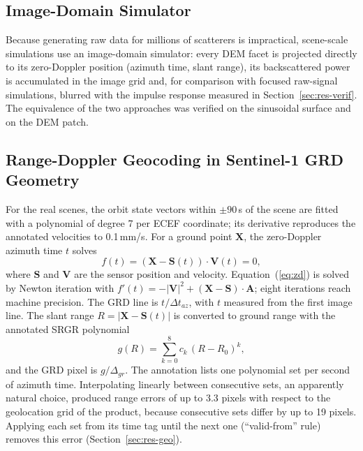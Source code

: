 \documentclass[10pt,a4paper]{article}
\begin{document}
\subsection{Image-Domain Simulator}
Because generating raw data for millions of scatterers is impractical, scene-scale simulations use an image-domain simulator: every DEM facet is projected directly to its zero-Doppler position (azimuth time, slant range), its backscattered power is accumulated in the image grid and, for comparison with focused raw-signal simulations, blurred with the impulse response measured in Section~\ref{sec:res-verif}. The equivalence of the two approaches was verified on the sinusoidal surface and on the DEM patch.

\subsection{Range-Doppler Geocoding in Sentinel-1 GRD Geometry}
For the real scenes, the orbit state vectors within $\pm90$\,s of the scene are fitted with a polynomial of degree 7 per ECEF coordinate; its derivative reproduces the annotated velocities to 0.1\,mm/s. For a ground point $\mathbf{X}$, the zero-Doppler azimuth time $t$ solves
\begin{equation}
f(t)=\left(\mathbf{X}-\mathbf{S}(t)\right)\cdot\mathbf{V}(t)=0,
\label{eq:zd}
\end{equation}
where $\mathbf{S}$ and $\mathbf{V}$ are the sensor position and velocity. Equation~(\ref{eq:zd}) is solved by Newton iteration with $f'(t)=-|\mathbf{V}|^2+(\mathbf{X}-\mathbf{S})\cdot\mathbf{A}$; eight iterations reach machine precision. The GRD line is $t/\Delta t_{az}$, with $t$ measured from the first image line. The slant range $R=|\mathbf{X}-\mathbf{S}(t)|$ is converted to ground range with the annotated SRGR polynomial
\begin{equation}
g(R)=\sum_{k=0}^{8}c_k\,(R-R_0)^k ,
\end{equation}
and the GRD pixel is $g/\Delta_{gr}$. The annotation lists one polynomial set per second of azimuth time. Interpolating linearly between consecutive sets, an apparently natural choice, produced range errors of up to 3.3 pixels with respect to the geolocation grid of the product, because consecutive sets differ by up to 19 pixels. Applying each set from its time tag until the next one (``valid-from'' rule) removes this error (Section~\ref{sec:res-geo}).
\end{document}
